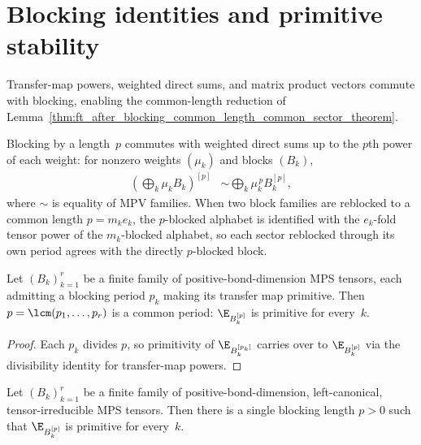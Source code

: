 
\section{Blocking identities and primitive stability}
\label{sec:app_canonical_blocking}

Transfer-map powers, weighted direct sums, and matrix product vectors commute
with blocking, enabling the common-length reduction of
Lemma~\ref{thm:ft_after_blocking_common_length_common_sector_theorem}.

Blocking by a length~$p$ commutes with weighted direct sums up to the $p$th power
of each weight: for nonzero weights $(\mu_k)$ and blocks $(B_k)$,
\begin{align}
    \left(\bigoplus_k\mu_kB_k\right)^{[p]}
     & \sim
    \bigoplus_k\mu_k^{\,p}B_k^{[p]},
    \label{eq:canonical_block_weight_power}
\end{align}
where $\sim$ is equality of MPV families. When two block families are reblocked
to a common length $p=m_ke_k$, the $p$-blocked alphabet is identified with the
$e_k$-fold tensor power of the $m_k$-blocked alphabet, so each sector reblocked
through its own period agrees with the directly $p$-blocked block.

\begin{lemma}%
    \label{thm:common_blocking_period}
    \leanok
    Let $(B_k)_{k=1}^r$ be a finite family of positive-bond-dimension MPS
    tensors, each admitting a blocking period $p_k$ making its transfer map
    primitive. Then $p=\lcm(p_1,\ldots,p_r)$ is a common
    period: $\E_{B_k^{[p]}}$ is primitive for every~$k$.
\end{lemma}

\begin{proof}\leanok
    Each $p_k$ divides $p$, so primitivity of $\E_{B_k^{[p_k]}}$ carries over
    to $\E_{B_k^{[p]}}$ via the divisibility identity for transfer-map powers.
\end{proof}

\begin{lemma}%
    \label{thm:common_blocking_period_tp_irreducible}
    \leanok
    Let $(B_k)_{k=1}^r$ be a finite family of positive-bond-dimension,
    left-canonical, tensor-irreducible MPS tensors. Then there is a single
    blocking length $p>0$ such that $\E_{B_k^{[p]}}$ is primitive for every~$k$.
\end{lemma}

